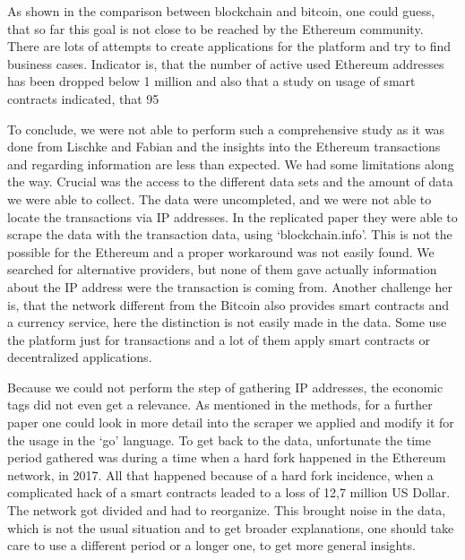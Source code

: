 As shown in the comparison between blockchain and bitcoin, one could guess, that so far this goal is not close to be reached by the Ethereum community. There are lots of attempts to create applications for the platform and try to find business cases. Indicator is, that the number of active used Ethereum addresses has been dropped below 1 million and also that a study on usage of smart contracts indicated, that 95%

To conclude, we were not able to perform such a comprehensive study as it was done from Lischke and Fabian and the insights into the Ethereum transactions and regarding information are less than expected. We had some limitations along the way. 
Crucial was the access to the different data sets and the amount of data we were able to collect. The data were uncompleted, and we were not able to locate the transactions via IP addresses. In the replicated paper they were able to scrape the data with the transaction data, using ‘blockchain.info’. This is not the possible for the Ethereum and a proper workaround was not easily found. We searched for alternative providers, but none of them gave actually information about the IP address were the transaction is coming from. Another challenge her is, that the network different from the Bitcoin also provides smart contracts and a currency service, here the distinction is not easily made in the data. Some use the platform just for transactions and a lot of them apply smart contracts or decentralized applications.

Because we could not perform the step of gathering IP addresses, the economic tags did not even get a relevance. As mentioned in the methods, for a further paper one could look in more detail into the scraper we applied and modify it for the usage in the ‘go’ language. 
To get back to the data, unfortunate the time period gathered was during a time when a hard fork happened in the Ethereum network, in 2017. All that happened because of a hard fork incidence, when a complicated hack of a smart contracts leaded to a loss of 12,7 million US Dollar. The network got divided and had to reorganize. This brought noise in the data, which is not the usual situation and to get broader explanations, one should take care to use a different period or a longer one, to get more general insights. 

